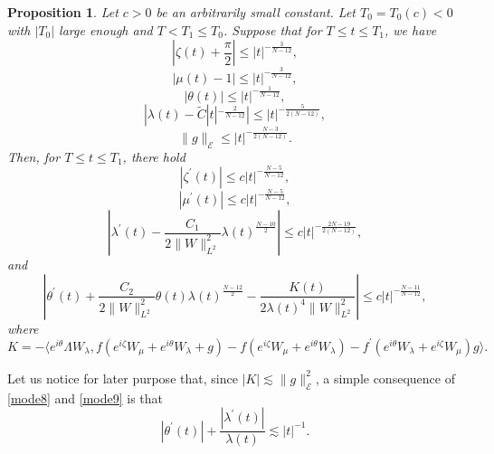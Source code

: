 \documentclass[a4paper,two-side,10pt]{amsart}
\newtheorem{prop}{Proposition}[section]
\numberwithin{equation}{section}
\begin{document}
\begin{prop}\label{lem3.1}
Let $c>0$ be an arbitrarily small constant. Let $T_0=T_0(c)<0$ with $|T_0|$ large enough and $T<T_1 \leq T_0$. Suppose that for $T\leq t \leq T_1$, we have
\begin{equation}
\label{mode1}
|\zeta (t) +\frac{\pi}{2}| \leq |t|^{-\frac{3}{N-12}},
\end{equation}
\begin{equation}
\label{mode2}
|\mu (t) -1| \leq |t|^{-\frac{3}{N-12}},
\end{equation}
\begin{equation}
\label{mode3}
|\theta (t)| \leq |t|^{-\frac{1}{N-12}},
\end{equation}
\begin{equation}
\label{mode4}
|\lambda (t) - \tilde{C} |t|^{-\frac{2}{N-12}} |\leq 
|t|^{-\frac{5}{2(N-12)}},
\end{equation}
\begin{equation}
\label{mode5}
\|g\|_{\mathcal{E}} \leq |t|^{-\frac{N-3}{2(N-12)}}.
\end{equation}
Then, for $T\leq t\leq T_1$, there hold
\begin{equation}
\label{mode6}
|\zeta^\prime (t)|\leq c |t|^{-\frac{N-5}{N-12}},
\end{equation}
\begin{equation}
\label{mode7}
|\mu^\prime (t)| \leq c |t|^{-\frac{N-5}{N-12}},
\end{equation}
\begin{equation}
\label{mode8}
\left|\lambda^\prime (t) - \frac{C_1}{2\|W\|_{L^2}^2} \lambda(t)^{\frac{N-10}{2}}\right|\leq c |t|^{-\frac{2N-19}{2(N-12)}} ,
\end{equation}
and
\begin{equation}
\label{mode9}
\left|\theta^\prime (t) + \frac{C_2}{2\|W\|_{L^2}^2}\theta(t)\lambda(t)^{\frac{N-12}{2}} -\frac{K(t)}{2\lambda(t)^4 \|W\|_{L^2}^2} \right|\leq c |t|^{-\frac{N-11}{N-12}} ,
\end{equation}
where
$$K= - \langle  e^{i\theta}  \Lambda W_\lambda ,  f(e^{i\zeta} W_\mu +e^{i\theta} W_\lambda +g) - f(e^{i\zeta} W_\mu +e^{i\theta} W_\lambda) -f^\prime (e^{i\theta} W_\lambda +e^{i\zeta} W_\mu) g \rangle .$$
\end{prop}


Let us notice for later purpose that, since $|K|\lesssim \|g\|_{\mathcal{E}}^2$, a simple consequence of \eqref{mode8} and \eqref{mode9} is that
\begin{equation}\label{thetalambdaprime}
|\theta^\prime (t)|+
\frac{|\lambda^\prime (t)|}{\lambda(t)}\lesssim |t|^{-1}.
\end{equation}
\end{document}
